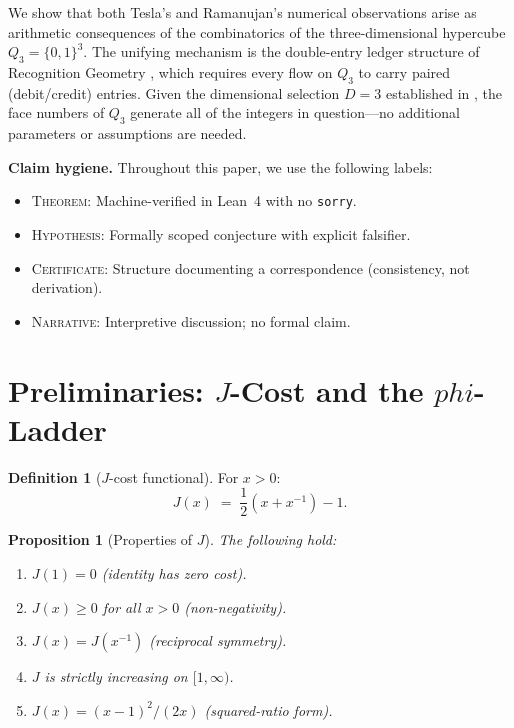 \documentclass[11pt]{article}
\def\leanverified{}
\def\leanhyp{}
\def\phig{phi}
\def\Jcost{J}
\theoremstyle{plain}
\newtheorem{proposition}[theorem]{Proposition}
\theoremstyle{definition}
\newtheorem{definition}[theorem]{Definition}
\theoremstyle{remark}
\newcommand{\leanverified}{\textsuperscript{\textnormal{[\textsc{Lean}]}}}
\newcommand{\leanhyp}{\textsuperscript{\textnormal{[\textsc{Hyp}]}}}
\newcommand{\phig}{\varphi}
\newcommand{\Jcost}{J}
\begin{document}
We show that both Tesla's and Ramanujan's numerical observations arise as arithmetic consequences of the combinatorics of the three-dimensional hypercube $Q_3 = \{0,1\}^3$.
The unifying mechanism is the double-entry ledger structure of Recognition Geometry \cite{WashburnZlatanovicAllahyarov2026}, which requires every flow on $Q_3$ to carry paired (debit/credit) entries.
Given the dimensional selection $D = 3$ established in \cite{PardoGuerraThapa2026}, the face numbers of $Q_3$ generate all of the integers in question---no additional parameters or assumptions are needed.

\medskip
\noindent\textbf{Claim hygiene.}\quad
Throughout this paper, we use the following labels:
\begin{itemize}[leftmargin=2em]
\item \textsc{Theorem}\leanverified: Machine-verified in Lean~4 with no \texttt{sorry}.
\item \textsc{Hypothesis}\leanhyp: Formally scoped conjecture with explicit falsifier.
\item \textsc{Certificate}: Structure documenting a correspondence (consistency, not derivation).
\item \textsc{Narrative}: Interpretive discussion; no formal claim.
\end{itemize}

\section[Preliminaries: J-Cost and the phi-Ladder]{Preliminaries: $\Jcost$-Cost and the $\phig$-Ladder}
\label{sec:prelim}

\begin{definition}[$\Jcost$-cost functional]
For $x > 0$:
\begin{equation}\label{eq:jcost}
  \Jcost(x) \;=\; \frac{1}{2}\!\left(x + x^{-1}\right) - 1.
\end{equation}
\end{definition}

\begin{proposition}[Properties of $\Jcost$]\leanverified\label{prop:j-properties}
The following hold:
\begin{enumerate}[label=(\roman*)]
\item $\Jcost(1) = 0$ \quad (identity has zero cost).
\item $\Jcost(x) \ge 0$ for all $x > 0$ \quad (non-negativity).
\item $\Jcost(x) = \Jcost(x^{-1})$ \quad (reciprocal symmetry).
\item $\Jcost$ is strictly increasing on $[1, \infty)$.
\item $\Jcost(x) = (x-1)^2 / (2x)$ \quad (squared-ratio form).
\end{enumerate}
\end{proposition}
\end{document}

